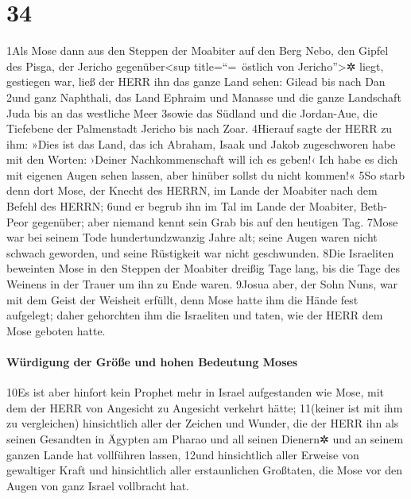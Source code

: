 \hypertarget{section-33}{%
\section{34}\label{section-33}}

1Als Mose dann aus den Steppen der Moabiter auf den Berg Nebo, den
Gipfel des Pisga, der Jericho gegenüber\textless sup title=``=~östlich
von Jericho''\textgreater✲ liegt, gestiegen war, ließ der HERR ihn das
ganze Land sehen: Gilead bis nach Dan 2und ganz Naphthali, das Land
Ephraim und Manasse und die ganze Landschaft Juda bis an das westliche
Meer 3sowie das Südland und die Jordan-Aue, die Tiefebene der
Palmenstadt Jericho bis nach Zoar. 4Hierauf sagte der HERR zu ihm: »Dies
ist das Land, das ich Abraham, Isaak und Jakob zugeschworen habe mit den
Worten: ›Deiner Nachkommenschaft will ich es geben!‹ Ich habe es dich
mit eigenen Augen sehen lassen, aber hinüber sollst du nicht kommen!«
5So starb denn dort Mose, der Knecht des HERRN, im Lande der Moabiter
nach dem Befehl des HERRN; 6und er begrub ihn im Tal im Lande der
Moabiter, Beth-Peor gegenüber; aber niemand kennt sein Grab bis auf den
heutigen Tag. 7Mose war bei seinem Tode hundertundzwanzig Jahre alt;
seine Augen waren nicht schwach geworden, und seine Rüstigkeit war nicht
geschwunden. 8Die Israeliten beweinten Mose in den Steppen der Moabiter
dreißig Tage lang, bis die Tage des Weinens in der Trauer um ihn zu Ende
waren. 9Josua aber, der Sohn Nuns, war mit dem Geist der Weisheit
erfüllt, denn Mose hatte ihm die Hände fest aufgelegt; daher gehorchten
ihm die Israeliten und taten, wie der HERR dem Mose geboten hatte.

\hypertarget{wuxfcrdigung-der-gruxf6uxdfe-und-hohen-bedeutung-moses}{%
\paragraph{Würdigung der Größe und hohen Bedeutung
Moses}\label{wuxfcrdigung-der-gruxf6uxdfe-und-hohen-bedeutung-moses}}

10Es ist aber hinfort kein Prophet mehr in Israel aufgestanden wie Mose,
mit dem der HERR von Angesicht zu Angesicht verkehrt hätte; 11(keiner
ist mit ihm zu vergleichen) hinsichtlich aller der Zeichen und Wunder,
die der HERR ihn als seinen Gesandten in Ägypten am Pharao und all
seinen Dienern✲ und an seinem ganzen Lande hat vollführen lassen, 12und
hinsichtlich aller Erweise von gewaltiger Kraft und hinsichtlich aller
erstaunlichen Großtaten, die Mose vor den Augen von ganz Israel
vollbracht hat.
